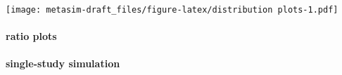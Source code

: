 \documentclass[]{article}
\newenvironment{Shaded}{\begin{snugshade}}{\end{snugshade}}
\newcommand{\DataTypeTok}[1]{\textcolor[rgb]{0.13,0.29,0.53}{#1}}
\newcommand{\KeywordTok}[1]{\textcolor[rgb]{0.13,0.29,0.53}{\textbf{#1}}}
\newcommand{\NormalTok}[1]{#1}
\newcommand{\OperatorTok}[1]{\textcolor[rgb]{0.81,0.36,0.00}{\textbf{#1}}}
\newcommand{\OtherTok}[1]{\textcolor[rgb]{0.56,0.35,0.01}{#1}}
\newcommand{\StringTok}[1]{\textcolor[rgb]{0.31,0.60,0.02}{#1}}
\let\oldparagraph\paragraph
\renewcommand{\paragraph}[1]{\oldparagraph{#1}\mbox{}}
\begin{document}
\texttt{[image: metasim-draft\_files/figure-latex/distribution plots-1.pdf]}

\hypertarget{ratio-plots}{%
\paragraph{ratio plots}\label{ratio-plots}}

\hypertarget{single-study-simulation}{%
\paragraph{single-study simulation}\label{single-study-simulation}}

\begin{Shaded}
\end{Shaded}
\end{document}
